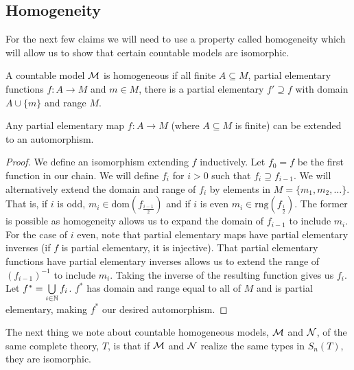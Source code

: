 \subsection{Homogeneity}

For the next few claims we will need to use a property called homogeneity which will allow us to show that certain countable models are isomorphic.

\begin{definition}\label{definition_homogeneity}
A countable model \(\mathcal{M}\) is homogeneous if all finite \(A \subseteq M\), partial elementary functions \(f: A \to M\) and \(m \in M\), there is a partial elementary \(f' \supseteq f\) with domain \(A \cup \{m\}\) and range \(M\).
\end{definition}

\begin{lemma}\label{theorem_partial_elementary_automorphism}
Any partial elementary map \(f: A \to M\) (where \(A \subseteq M\) is finite) can be extended to an automorphism. 
\end{lemma}

\begin{proof}
We define an isomorphism extending \(f\) inductively. 
Let \(f_0 = f\) be the first function in our chain.
We will define \(f_i\) for \(i > 0\) such that \(f_{i} \supseteq f_{i-1}\).
We will alternatively extend the domain and range of \(f_i\) by elements in \(M = \{m_1, m_2, \ldots\}\).
That is, if \(i\) is odd, \(m_i \in \text{dom}(f_{\frac{i-1}{2}})\) and if \(i\) is even \(m_i \in \text{rng}(f_{\frac{i}{2}})\).
The former is possible as homogeneity allows us to expand the domain of \(f_{i-1}\) to include \(m_i\).
For the case of \(i\) even, note that partial elementary maps have partial elementary inverses (if \(f\) is partial elementary, it is injective). 
That partial elementary functions have partial elementary inverses allows us to extend the range of \((f_{i-1})^{-1}\) to include \(m_i\). 
Taking the inverse of the resulting function gives us \(f_i\).
Let \(f^* = \bigcup\limits_{i \in \mathbb{N}}f_i\).
\(f^*\) has domain and range equal to all of \(M\) and is partial elementary, making \(f^*\) our desired automorphism.
\end{proof}

\begin{lemma}\label{lemma_types_isomorphism}
The next thing we note about countable homogeneous models, \(\mathcal{M}\) and \(\mathcal{N}\), of the same complete theory, \(T\), is that if \(\mathcal{M}\) and \(\mathcal{N}\) realize the same types in \(S_n(T)\), they are isomorphic.
\end{lemma}

